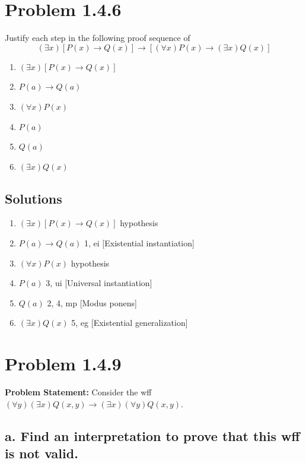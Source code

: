 \documentclass[12pt]{article}
\begin{document}
\newpage
\section*{Problem 1.4.6}

Justify each step in the following proof sequence of
\[
(\exists x)[P(x)\rightarrow Q(x)] \rightarrow [(\forall x)P(x)\rightarrow (\exists x)Q(x)]
\]

\begin{enumerate}
    \item \( (\exists x)[P(x)\rightarrow Q(x)] \)
    \item \( P(a)\rightarrow Q(a) \)
    \item \( (\forall x)P(x) \)
    \item \( P(a) \)
    \item \( Q(a) \)
    \item \( (\exists x)Q(x) \)
\end{enumerate}
\subsection*{Solutions}
\begin{enumerate}
    \item \( (\exists x)[P(x)\rightarrow Q(x)] \) \hfill hypothesis
    \item \( P(a)\rightarrow Q(a) \) \hfill 1, ei [Existential instantiation]
    \item \( (\forall x)P(x) \) \hfill hypothesis
    \item \( P(a) \) \hfill 3, ui [Universal instantiation]
    \item \( Q(a) \) \hfill 2, 4, mp [Modus ponens]
    \item \( (\exists x)Q(x) \) \hfill 5, eg [Existential generalization]
\end{enumerate}
\newpage
\section*{Problem 1.4.9}
\textbf{Problem Statement:}
Consider the wff \( (\forall y)(\exists x)Q(x,y) \rightarrow (\exists x)(\forall y)Q(x,y) \).

\subsection*{a. Find an interpretation to prove that this wff is not valid.}
\end{document}
